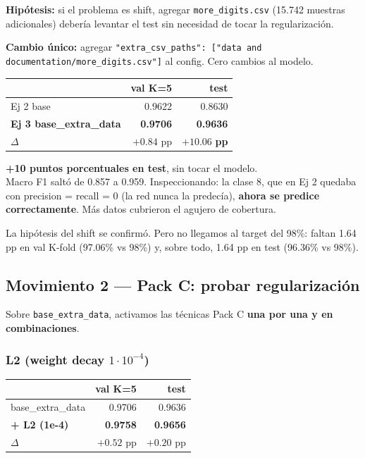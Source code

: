 \documentclass[11pt,a4paper]{article}
\newcommand{\code}[1]{\texttt{\textcolor{accent}{#1}}}
\newcommand{\winner}[1]{\cellcolor{accent2!15}\textbf{#1}}
\begin{document}
\textbf{Hipótesis:} si el problema es shift, agregar \code{more\_digits.csv} (15.742 muestras adicionales) debería levantar el test sin necesidad de tocar la regularización.

\textbf{Cambio único:} agregar \code{"extra\_csv\_paths": ["data and documentation/more\_digits.csv"]} al config. Cero cambios al modelo.

\begin{center}
\small
\begin{tabular}{@{}lrr@{}}
\toprule
& \textbf{val K=5} & \textbf{test} \\
\midrule
Ej 2 base                 & 0.9622 & 0.8630 \\
\winner{Ej 3 base\_extra\_data}  & \winner{0.9706} & \winner{0.9636} \\
$\Delta$                  & $+0.84$ pp & $\boldsymbol{+10.06}$ \textbf{pp} \\
\bottomrule
\end{tabular}
\end{center}

\begin{sorpresa}
\textbf{+10 puntos porcentuales en test}, sin tocar el modelo. \\[0.2em]
Macro F1 saltó de 0.857 a 0.959. Inspeccionando: la clase 8, que en Ej 2 quedaba con precision = recall = 0 (la red nunca la predecía), \textbf{ahora se predice correctamente}. Más datos cubrieron el agujero de cobertura.
\end{sorpresa}

\begin{aprendimos}
La hipótesis del shift se confirmó. Pero no llegamos al target del 98\%: faltan 1.64 pp en val K-fold (97.06\% vs 98\%) y, sobre todo, 1.64 pp en test (96.36\% vs 98\%).
\end{aprendimos}

\subsection{Movimiento 2 — Pack C: probar regularización}

Sobre \code{base\_extra\_data}, activamos las técnicas Pack C \textbf{una por una y en combinaciones}.

\subsubsection{L2 (weight decay $1\!\cdot\!10^{-4}$)}

\begin{center}
\small
\begin{tabular}{@{}lrr@{}}
\toprule
& \textbf{val K=5} & \textbf{test} \\
\midrule
base\_extra\_data        & 0.9706 & 0.9636 \\
\winner{+ L2 (1e-4)}     & \winner{0.9758} & \winner{0.9656} \\
$\Delta$                 & $+0.52$ pp & $+0.20$ pp \\
\bottomrule
\end{tabular}
\end{center}
\end{document}

